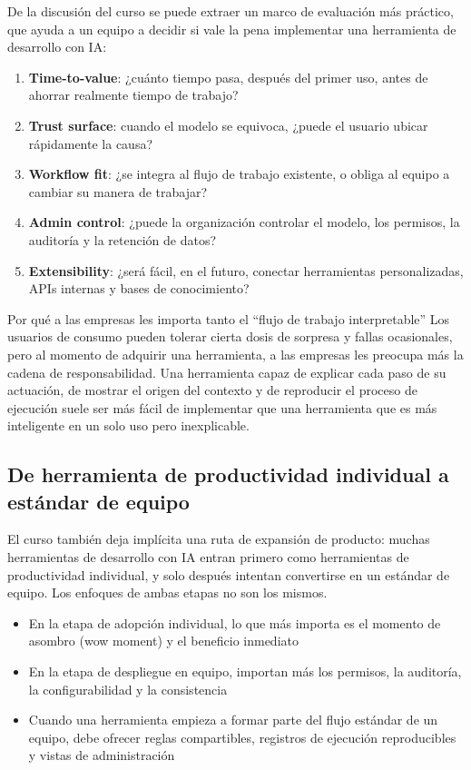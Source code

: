 \documentclass[a4paper]{article}
\begin{document}
De la discusión del curso se puede extraer un marco de evaluación más práctico, que ayuda a un equipo a decidir si vale la pena implementar una herramienta de desarrollo con IA:

\begin{enumerate}
    \item \textbf{Time-to-value}: ¿cuánto tiempo pasa, después del primer uso, antes de ahorrar realmente tiempo de trabajo?
    \item \textbf{Trust surface}: cuando el modelo se equivoca, ¿puede el usuario ubicar rápidamente la causa?
    \item \textbf{Workflow fit}: ¿se integra al flujo de trabajo existente, o obliga al equipo a cambiar su manera de trabajar?
    \item \textbf{Admin control}: ¿puede la organización controlar el modelo, los permisos, la auditoría y la retención de datos?
    \item \textbf{Extensibility}: ¿será fácil, en el futuro, conectar herramientas personalizadas, APIs internas y bases de conocimiento?
\end{enumerate}

\begin{knowledgebox}{Por qué a las empresas les importa tanto el ``flujo de trabajo interpretable''}
Los usuarios de consumo pueden tolerar cierta dosis de sorpresa y fallas ocasionales, pero al momento de adquirir una herramienta, a las empresas les preocupa más la cadena de responsabilidad. Una herramienta capaz de explicar cada paso de su actuación, de mostrar el origen del contexto y de reproducir el proceso de ejecución suele ser más fácil de implementar que una herramienta que es más inteligente en un solo uso pero inexplicable.
\end{knowledgebox}

\subsection{De herramienta de productividad individual a estándar de equipo}

El curso también deja implícita una ruta de expansión de producto: muchas herramientas de desarrollo con IA entran primero como herramientas de productividad individual, y solo después intentan convertirse en un estándar de equipo. Los enfoques de ambas etapas no son los mismos.

\begin{itemize}
    \item En la etapa de adopción individual, lo que más importa es el momento de asombro (wow moment) y el beneficio inmediato
    \item En la etapa de despliegue en equipo, importan más los permisos, la auditoría, la configurabilidad y la consistencia
    \item Cuando una herramienta empieza a formar parte del flujo estándar de un equipo, debe ofrecer reglas compartibles, registros de ejecución reproducibles y vistas de administración
\end{itemize}
\end{document}
